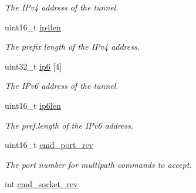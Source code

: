 \begin{DoxyCompactItemize}
\begin{DoxyCompactList}\small\item\em The I\-Pv4 address of the tunnel. \end{DoxyCompactList}\item 
\hypertarget{structtunnel__struct_a4be2792dc99823e3e26eef66694db3fe}{uint16\-\_\-t \hyperlink{structtunnel__struct_a4be2792dc99823e3e26eef66694db3fe}{ip4len}}\label{structtunnel__struct_a4be2792dc99823e3e26eef66694db3fe}

\begin{DoxyCompactList}\small\item\em The prefix length of the I\-Pv4 address. \end{DoxyCompactList}\item 
\hypertarget{structtunnel__struct_a1a248d3cc4f3696ae959241b18e3ca5a}{uint32\-\_\-t \hyperlink{structtunnel__struct_a1a248d3cc4f3696ae959241b18e3ca5a}{ip6} \mbox{[}4\mbox{]}}\label{structtunnel__struct_a1a248d3cc4f3696ae959241b18e3ca5a}

\begin{DoxyCompactList}\small\item\em The I\-Pv6 address of the tunnel. \end{DoxyCompactList}\item 
\hypertarget{structtunnel__struct_a8839c32864cc033c469087bcdd47b127}{uint16\-\_\-t \hyperlink{structtunnel__struct_a8839c32864cc033c469087bcdd47b127}{ip6len}}\label{structtunnel__struct_a8839c32864cc033c469087bcdd47b127}

\begin{DoxyCompactList}\small\item\em The pref.\-length of the I\-Pv6 address. \end{DoxyCompactList}\item 
\hypertarget{structtunnel__struct_a8c464a0e2a0595421b63f434d131f512}{uint16\-\_\-t \hyperlink{structtunnel__struct_a8c464a0e2a0595421b63f434d131f512}{cmd\-\_\-port\-\_\-rcv}}\label{structtunnel__struct_a8c464a0e2a0595421b63f434d131f512}

\begin{DoxyCompactList}\small\item\em The port number for multipath commands to accept. \end{DoxyCompactList}\item 
\hypertarget{structtunnel__struct_a4dbc57f58459e689bbc8b7705868ec2d}{int \hyperlink{structtunnel__struct_a4dbc57f58459e689bbc8b7705868ec2d}{cmd\-\_\-socket\-\_\-rcv}}\label{structtunnel__struct_a4dbc57f58459e689bbc8b7705868ec2d}


\end{DoxyCompactItemize}

